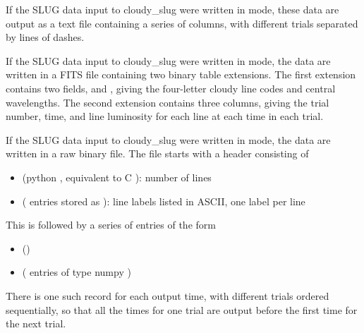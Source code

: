 \documentclass[letterpaper,10pt,english]{sphinxmanual}
\begin{document}
If the SLUG data input to cloudy\_slug were written in  mode,
these data are output as a text file containing a series of columns,
with different trials separated by lines of dashes.

If the SLUG data input to cloudy\_slug were written in  mode,
the data are written in a FITS file containing two binary table
extensions. The first extension contains two fields,  and
, giving the four-letter cloudy line codes and central
wavelengths. The second extension contains three columns, giving the
trial number, time, and line luminosity for each line at each time in
each trial.

If the SLUG data input to cloudy\_slug were written in  mode,
the data are written in a raw binary file. The file starts with a
header consisting of
\begin{itemize}
\item {} 
 (python , equivalent to C ): number of lines

\item {} 
 ( entries stored as ): line
labels listed in ASCII, one label per line

\end{itemize}

This is followed by a series of entries of the form
\begin{itemize}
\item {} 
 ()

\item {} 
 ( entries of type numpy )

\end{itemize}

There is one such record for each output time, with different trials
ordered sequentially, so that all the times for one trial are output
before the first time for the next trial.
\end{document}

